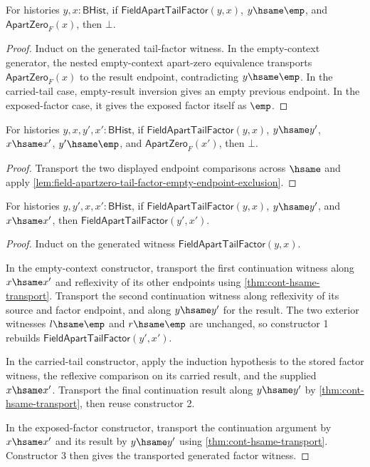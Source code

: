 \begin{lemma}
\label{lem:field-apartzero-tail-factor-empty-endpoint-exclusion}
For histories $y,x:\mathsf{BHist}$, if
$\mathsf{FieldApartTailFactor}(y,x)$, $y\hsame\emp$, and
$\mathsf{ApartZero}_F(x)$, then $\bot$.
\end{lemma}
\begin{proof} Induct on the generated tail-factor witness. In the empty-context generator,
the nested empty-context apart-zero equivalence transports
$\mathsf{ApartZero}_F(x)$ to the result endpoint, contradicting $y\hsame\emp$.
In the carried-tail case, empty-result inversion gives an empty previous endpoint.
In the exposed-factor case, it gives the exposed factor itself as $\emp$.
\end{proof}
\begin{theorem}\label{thm:field-apart-tail-factor-empty-endpoint-exclusion-hsame-transport}
For histories $y,x,y',x':\mathsf{BHist}$, if $\mathsf{FieldApartTailFactor}(y,x)$, $y\hsame y'$, $x\hsame x'$, $y'\hsame\emp$, and $\mathsf{ApartZero}_F(x')$, then $\bot$.
\end{theorem}
\begin{proof} Transport the two displayed endpoint comparisons across $\hsame$ and apply \autoref{lem:field-apartzero-tail-factor-empty-endpoint-exclusion}. \end{proof}
\begin{lemma}
\label{lem:field-apartzero-tail-factor-hsame-transport}
For histories $y,y',x,x':\mathsf{BHist}$, if
$\mathsf{FieldApartTailFactor}(y,x)$, $y\hsame y'$, and $x\hsame x'$, then
$\mathsf{FieldApartTailFactor}(y',x')$.
\end{lemma}
\begin{proof}
Induct on the generated witness
$\mathsf{FieldApartTailFactor}(y,x)$.

In the empty-context constructor, transport the first continuation witness along
$x\hsame x'$ and reflexivity of its other endpoints using
\autoref{thm:cont-hsame-transport}. Transport the second continuation witness
along reflexivity of its source and factor endpoint, and along $y\hsame y'$ for
the result. The two exterior witnesses $l\hsame\emp$ and $r\hsame\emp$ are
unchanged, so constructor 1 rebuilds
$\mathsf{FieldApartTailFactor}(y',x')$.

In the carried-tail constructor, apply the induction hypothesis to the stored
factor witness, the reflexive comparison on its carried result, and the supplied
$x\hsame x'$. Transport the final continuation result along $y\hsame y'$ by
\autoref{thm:cont-hsame-transport}, then reuse constructor 2.

In the exposed-factor constructor, transport the continuation argument by
$x\hsame x'$ and its result by $y\hsame y'$ using
\autoref{thm:cont-hsame-transport}. Constructor 3 then gives the transported
generated factor witness.
\end{proof}
